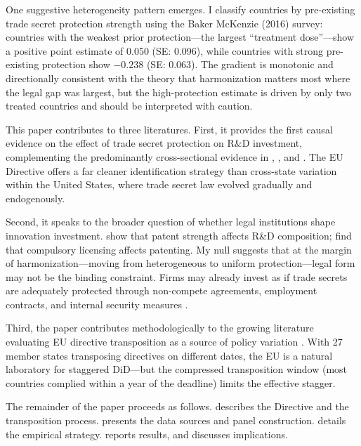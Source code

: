 \documentclass[12pt]{article}
\begin{document}
One suggestive heterogeneity pattern emerges. I classify countries by pre-existing trade secret protection strength using the Baker McKenzie (2016) survey: countries with the weakest prior protection---the largest ``treatment dose''---show a positive point estimate of 0.050 (SE: 0.096), while countries with strong pre-existing protection show $-0.238$ (SE: 0.063). The gradient is monotonic and directionally consistent with the theory that harmonization matters most where the legal gap was largest, but the high-protection estimate is driven by only two treated countries and should be interpreted with caution.

This paper contributes to three literatures. First, it provides the first causal evidence on the effect of trade secret protection on R\&D investment, complementing the predominantly cross-sectional evidence in \citet{Png2017}, \citet{ContigianiHsuBarankay2018}, and \citet{Li2023}. The EU Directive offers a far cleaner identification strategy than cross-state variation within the United States, where trade secret law evolved gradually and endogenously.

Second, it speaks to the broader question of whether legal institutions shape innovation investment. \citet{AroraCC2008} show that patent strength affects R\&D composition; \citet{MoserVoena2012} find that compulsory licensing affects patenting. My null suggests that at the margin of harmonization---moving from heterogeneous to uniform protection---legal form may not be the binding constraint. Firms may already invest as if trade secrets are adequately protected through non-compete agreements, employment contracts, and internal security measures \citep{AlmGilpatric2019, Marx2022}.

Third, the paper contributes methodologically to the growing literature evaluating EU directive transposition as a source of policy variation \citep{Dhingra2022, GirardoneLaurila2024}. With 27 member states transposing directives on different dates, the EU is a natural laboratory for staggered DiD---but the compressed transposition window (most countries complied within a year of the deadline) limits the effective stagger.

The remainder of the paper proceeds as follows.  describes the Directive and the transposition process.  presents the data sources and panel construction.  details the empirical strategy.  reports results, and  discusses implications.
\end{document}
